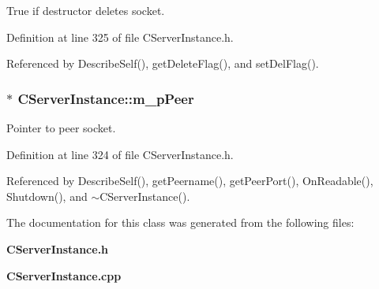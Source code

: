 True if destructor deletes socket.



Definition at line 325 of file CServer\-Instance.h.

Referenced by Describe\-Self(), get\-Delete\-Flag(), and set\-Del\-Flag().
\subsubsection{$\ast$ CServer\-Instance::m\_\-p\-Peer\hspace{0.3cm}{\tt  [private]}}\label{classCServerInstance_o0}


Pointer to peer socket.



Definition at line 324 of file CServer\-Instance.h.

Referenced by Describe\-Self(), get\-Peername(), get\-Peer\-Port(), On\-Readable(), Shutdown(), and $\sim$CServer\-Instance().

The documentation for this class was generated from the following files:\begin{CompactItemize}
\item 
{\bf CServer\-Instance.h}\item 
{\bf CServer\-Instance.cpp}\end{CompactItemize}
